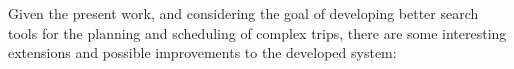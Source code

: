 




Given the present work, and considering the goal of developing better search tools for the planning and scheduling of complex trips, there are some interesting extensions and possible improvements to the developed system:

